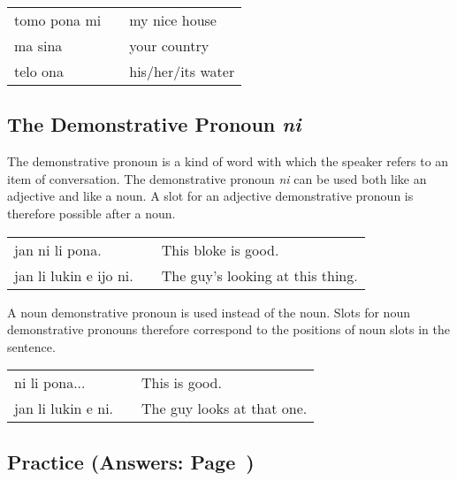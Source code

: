 \begin{supertabular}{p{5,5cm}|ll}
    tomo pona mi &  & my nice house     \\
    ma sina      &  & your country      \\
    telo ona     &  & his/her/its water \\
\end{supertabular}

%
\subsection*{The Demonstrative Pronoun \textit{ni}}
%
%

The demonstrative pronoun is a kind of word with which the speaker refers to an  item of conversation.
The demonstrative pronoun \textit{ni} can be used both like an adjective and like a noun.
A slot for an adjective demonstrative pronoun is therefore possible after a noun.

\begin{supertabular}{p{5,5cm}|ll}
    jan ni li pona.        &  & This bloke is good.              \\
    jan li lukin e ijo ni. &  & The guy's looking at this thing. \\
\end{supertabular}

A noun demonstrative pronoun is used instead of the noun.
Slots for noun demonstrative pronouns therefore correspond to the positions of noun slots in the sentence.

\begin{supertabular}{p{5,5cm}|ll}
    ni li pona...      &  & This is good.              \\
    jan li lukin e ni. &  & The guy looks at that one. \\
\end{supertabular}

\newpage
\subsection*{Practice (Answers: Page~\pageref{'adjectives'})}

